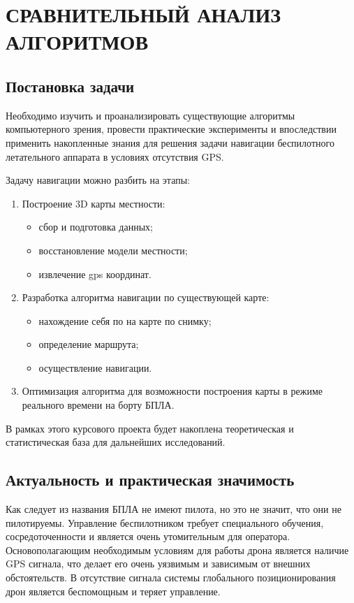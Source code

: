 \chapter{СРАВНИТЕЛЬНЫЙ АНАЛИЗ АЛГОРИТМОВ}

\section{Постановка задачи}

Необходимо изучить и проанализировать существующие алгоритмы компьютерного зрения, провести практические эксперименты и впоследствии применить накопленные знания для решения задачи навигации беспилотного летательного аппарата в условиях отсутствия GPS.

Задачу навигации можно разбить на этапы:
\begin{enumerate}
    \item Построение 3D карты местности:
        \begin{itemize}
            \item сбор и подготовка данных;
            \item восстановление модели местности;
            \item извлечение gps координат.
         \end{itemize}
    \item Разработка алгоритма навигации по существующей карте:
         \begin{itemize}
            \item нахождение себя по на карте по снимку;
            \item определение маршрута;
            \item осуществление навигации.
         \end{itemize}
    \item Оптимизация алгоритма для возможности построения карты в режиме реального времени на борту БПЛА.
\end{enumerate}

В рамках этого курсового проекта будет накоплена теоретическая и статистическая база для дальнейших исследований.

\section{Актуальность и практическая значимость}

Как следует из названия БПЛА не имеют пилота, но это не значит, что они не пилотируемы. Управление беспилотником требует специального обучения, сосредоточенности и является очень утомительным для оператора. Основополагающим необходимым условиям для работы дрона является наличие GPS сигнала, что делает его очень уязвимым и зависимым от внешних обстоятельств. В отсутствие сигнала системы глобального позиционирования дрон является беспомощным и теряет управление.

